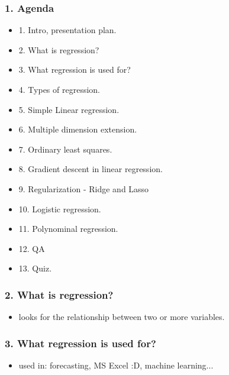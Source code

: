\documentclass[handout,compress]{beamer} %
\begin{document}
\renewcommand{\logosinfootline}{\raisebox{0.12cm}{\begin{beamercolorbox}{rafi}{Seminar \quad Overview regression methods \hfill \insertframenumber/\inserttotalframenumber}\end{beamercolorbox}}}
\begin{frame}[allowframebreaks]
	\frametitle{1. Agenda}
    \begin{itemize}
    \item 1. Intro, presentation plan.
    \item 2. What is regression?
    \item 3. What regression is used for?
    \item 4. Types of regression.
    \item 5. Simple Linear regression.
    \item 6. Multiple dimension extension.
    \item 7. Ordinary least squares.
    \item 8. Gradient descent in linear regression.
    \item 9. Regularization - Ridge and Lasso
    \item 10. Logistic regression.
    \item 11. Polynominal regression.
    \item 12. QA
    \item 13. Quiz.
	\end{itemize}
\end{frame}
\begin{frame}
	\frametitle{2. What is regression?}
	\begin{itemize}
	\item looks for the relationship between two or more variables.
\end{itemize}		
\end{frame}
\begin{frame}
	\frametitle{3. What regression is used for?}	
	\begin{itemize}
	\item used in: forecasting, MS Excel :D, machine learning...
	\end{itemize}
\end{frame}
\end{document}
